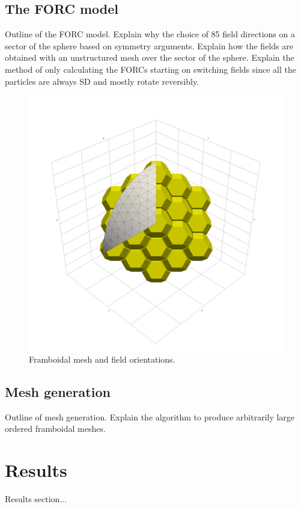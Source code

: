 \subsection{The FORC model}
Outline of the FORC model. Explain why the choice of 85 field directions on a sector of the sphere based on symmetry arguments. Explain how the fields are obtained with an unstructured mesh over the sector of the sphere. Explain the method of only calculating the FORCs starting on switching fields since all the particles are always SD and mostly rotate reversibly.\par
\begin{figure}
\centering
\includegraphics[width=\textwidth]{research-4/figs/mesh_orientations_HD.png}
\caption[Framboidal mesh and field orientations]{Framboidal mesh and field orientations.}
\label{FIG_01}
\end{figure}

\subsection{Mesh generation}
Outline of mesh generation. Explain the algorithm to produce arbitrarily large ordered framboidal meshes.\par

\section{Results}
Results section...\par

